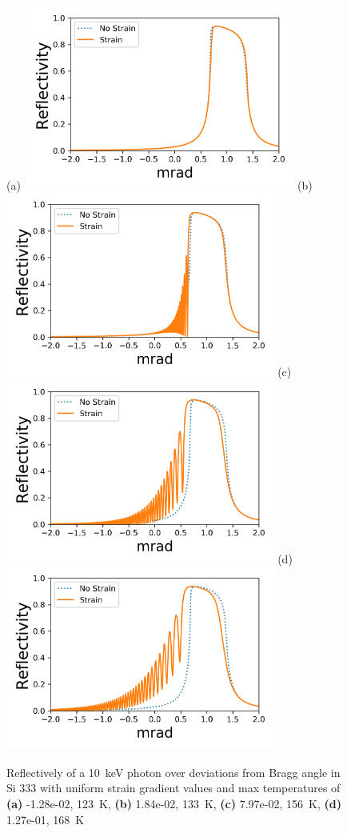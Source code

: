 \documentclass[preprint]{iucr}              %
\begin{document}
\begin{figure}
\caption{Reflectively of a 10~keV photon over deviations from Bragg angle in Si 333 with uniform strain gradient values and max temperatures of \textbf{(a)} -1.28e-02, 123~K, \textbf{(b)} 1.84e-02, 133~K, \textbf{(c)} 7.97e-02, 156~K, \textbf{(d)}  1.27e-01, 168~K}
(a)~\includegraphics[width = 8.85cm]{images/333_10keV_4.png}
(b)~\includegraphics[width = 8.85cm]{images/333_10keV_5.png}
(c)~\includegraphics[width = 8.85cm]{images/333_10keV_7.png}
(d)~\includegraphics[width = 8.85cm]{images/333_10keV_8.png}
\label{fig:333usg10kev}
\end{figure}
\end{document}
